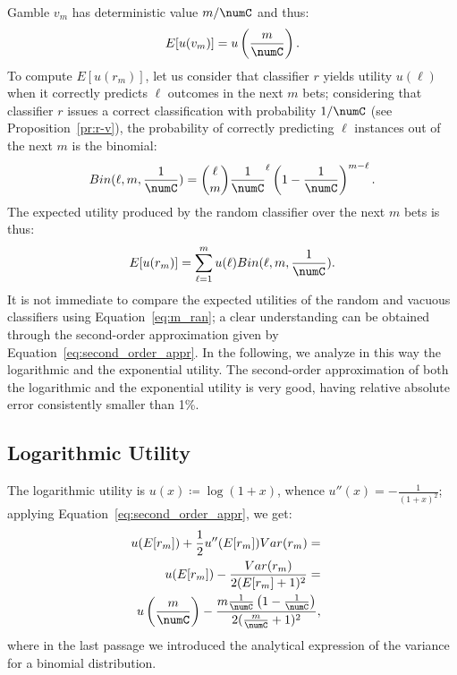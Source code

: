 \documentclass[a4paper,10pt,reqno]{amsart}
\theoremstyle{remark}
\begin{document}
Gamble $v_m$ has deterministic value $m/\numC$ and thus:
\begin{equation}
E[u(v_m)]=u\left(\frac{m}{\numC} \right).\notag%
\end{equation}
To compute $E[u(r_m)]$, let us consider that classifier $r$ yields utility $u(\ell)$ when it correctly predicts $\ell$ outcomes in the next $m$ bets; considering that classifier $r$ issues a correct classification with probability $1/\numC$ (see Proposition~\ref{pr:r-v}),
the probability of correctly predicting $\ell$ instances out of the next $m$ is the binomial:
\begin{equation*}
Bin(\ell,m,\frac{1}{\numC})=\binom{\ell}{m}\frac{1}{\numC}^\ell\left(1-\frac{1}{\numC}\right)^{m-\ell}.
\end{equation*}
The expected utility produced by the random classifier over the next $m$ bets is thus:
\begin{equation}
E[u(r_m)]=\sum_{\ell=1}^{m}u(\ell)Bin(\ell,m,\frac{1}{\numC}).\label{eq:m_ran}
\end{equation}
It is not immediate to compare the expected utilities of the random and vacuous classifiers using Equation~\eqref{eq:m_ran}; a clear understanding can be obtained through the second-order approximation given by Equation~\eqref{eq:second_order_appr}. In the following, we analyze in this way the logarithmic and the exponential utility. The second-order approximation of both the logarithmic and the exponential utility is very good, having relative absolute error consistently smaller than 1\%.

\subsection{Logarithmic Utility}
The logarithmic utility is $u(x)\coloneqq \log(1+x)$, whence $u''(x)=-\frac{1}{(1+x)^2}$; applying Equation~\eqref{eq:second_order_appr}, we get:
\begin{align}
 u(E[r_m])+\frac{1}{2}
u''(E[r_m])Var(r_m)=\nonumber\\
 u(E[r_m])-\frac{Var(r_m)}{2(E[r_m]+1)^{2}}=\nonumber\\
u\left(\frac{m}{\numC}\right)-\frac{m\frac{1}{\numC}\left(1-\frac{1}{\numC}\right)}{2(\frac{m}{\numC}+1)^{2}},&&\notag
\end{align}
where in the last passage we introduced the analytical expression of the variance for a binomial distribution.
\end{document}
